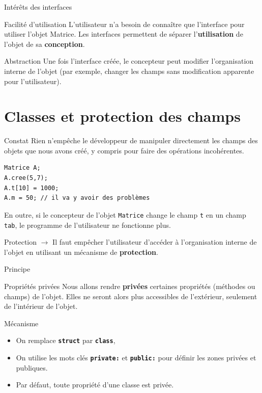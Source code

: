 \begin{frame}{Intérêts des interfaces}
    \begin{block}{Facilité d'utilisation}
    L'utilisateur n'a besoin de connaître que l'interface pour utiliser l'objet Matrice. Les interfaces permettent de séparer l'\textbf{utilisation} de l'objet de sa \textbf{conception}.
    \end{block}
    \begin{block}{Abstraction}
    Une fois l'interface créée, le concepteur peut modifier l'organisation interne de l'objet (par exemple, changer les champs sans modification apparente pour l'utilisateur).
    \end{block}
\end{frame}

\section{Classes et protection des champs}

\begin{frame}[fragile]{Constat}
    Rien n'empêche le développeur de manipuler directement les champs des objets que nous avons créé, y compris pour faire des opérations incohérentes.
    
    \begin{verbatim}
Matrice A;
A.cree(5,7);
A.t[10] = 1000;
A.m = 50; // il va y avoir des problèmes
    \end{verbatim}
    
    En outre, si le concepteur de l'objet \texttt{Matrice} change le champ \texttt{t} en un champ \texttt{tab}, le programme de l'utilisateur ne fonctionne plus.

    \begin{block}{Protection}
    $\longrightarrow$ Il faut empêcher l'utilisateur d'accéder à l'organisation interne de l'objet en utilisant un mécanisme de \textbf{protection}.
    \end{block}
\end{frame}

\begin{frame}[fragile]{Principe}
    \begin{block}{Propriétés privées}
    Nous allons rendre \textbf{privées} certaines propriétés (méthodes ou champs) de l'objet. Elles ne seront alors plus accessibles de l'extérieur, seulement de l'intérieur de l'objet.
    \end{block}

    \begin{exampleblock}{Mécanisme}
    \begin{itemize}
        \item On remplace \texttt{\textbf{struct}} par \texttt{\textbf{class}},
        \item On utilise les mots clés \texttt{\textbf{private:}} et \texttt{\textbf{public:}} pour définir les zones privées et publiques.
        \item Par défaut, toute propriété d'une classe est privée.
    \end{itemize}
    \end{exampleblock}
\end{frame}

